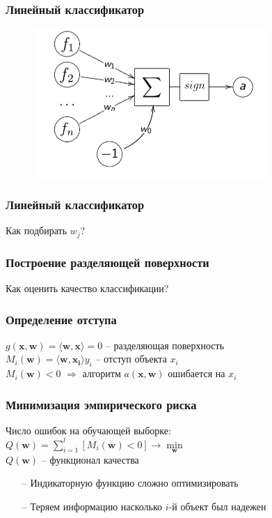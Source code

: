 \documentclass[12pt]{beamer}
\begin{document}
\begin{frame}\frametitle{Линейный классификатор}
\begin{figure}[htbp]
  \includegraphics[height=160pt, keepaspectratio = true]{images/neuron}   
\end{figure}
\end{frame}

\begin{frame}\frametitle{Линейный классификатор}
Как подбирать $w_j$?
\end{frame}

\begin{frame}\frametitle{Построение разделяющей поверхности}
Как оценить качество классификации?
\end{frame}

\begin{frame}\frametitle{Определение отступа}
${g(\mathbf{x}, \mathbf{w}) = \langle \mathbf{w}, \mathbf{x}\rangle = 0}$ -- разделяющая поверхность\\
$M_i(\mathbf{w}) = \langle \mathbf{w}, \mathbf{x_i}\rangle y_i$ -- отступ объекта $x_i$\\
${M_i(\mathbf{w})<0}$ $\Rightarrow$ алгоритм $a(\mathbf{x},\mathbf{w})$ ошибается на $x_i$
\end{frame}

\begin{frame}\frametitle{Минимизация эмпирического риска}
Число ошибок на обучающей выборке:\\
\vspace{5mm}
${Q(\mathbf{w}) = \sum\limits_{i=1}^l \left[ M_i(\mathbf{w}) < 0 \right] \rightarrow \min\limits_{\mathbf{w}} }$\\
\vspace{3mm}
${Q(\mathbf{w})}$ -- функционал качества\\
\vspace{5mm}

\begin{itemize}
\item[--] Индикаторную функцию сложно оптимизировать
\item[--] Теряем информацию насколько ${i}$-й объект был надежен
\end{itemize}
\end{frame}
\end{document}
